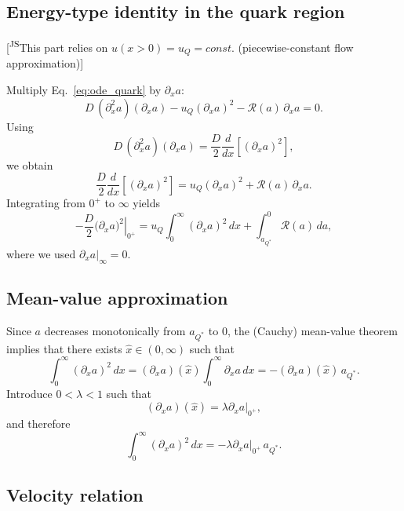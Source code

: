 \documentclass[11pt]{article}
\newcommand{\JScom}[1]{\textsf{\color{violet} [\textsuperscript{JS}#1]}}
\begin{document}
\subsection*{Energy-type identity in the quark region}

\JScom{This part relies on $u(x>0) = u_Q = const.$ (piecewise-constant flow approximation)}

Multiply Eq.~\eqref{eq:ode_quark} by $\partial_x a$:
\begin{equation}
D\,(\partial_x^2 a)(\partial_x a) - u_Q(\partial_x a)^2 - \mathcal R(a)\,\partial_x a = 0.
\end{equation}
Using
\[
D\,(\partial_x^2 a)(\partial_x a)=\frac{D}{2}\frac{d}{dx}\!\left[(\partial_x a)^2\right],
\]
we obtain
\begin{equation}
\frac{D}{2}\frac{d}{dx}\!\left[(\partial_x a)^2\right]
=
u_Q(\partial_x a)^2
+
\mathcal R(a)\,\partial_x a.
\end{equation}
Integrating from $0^+$ to $\infty$ yields
\begin{equation}
-\frac{D}{2}\left.\bigl(\partial_x a\bigr)^2\right|_{0^+}
=
u_Q \int_0^\infty (\partial_x a)^2\,dx
+
\int_{a_{Q^*}}^{0}\mathcal R(a)\,da,
\label{eq:balance_piecewise}
\end{equation}
where we used $\left.\partial_x a\right|_{\infty}=0$.

\subsection*{Mean-value approximation}

Since $a$ decreases monotonically from $a_{Q^*}$ to $0$, the (Cauchy) mean-value
theorem implies that there exists $\hat x\in(0,\infty)$ such that
\begin{equation}
\int_0^\infty (\partial_x a)^2\,dx
=
(\partial_x a)(\hat x)\int_0^\infty \partial_x a\,dx
=
-(\partial_x a)(\hat x)\,a_{Q^*}.
\end{equation}
Introduce $0<\lambda<1$ such that
\begin{equation}
(\partial_x a)(\hat x)=\lambda\left.\partial_x a\right|_{0^+},
\end{equation}
and therefore
\begin{equation}
\int_0^\infty (\partial_x a)^2\,dx
=
- \lambda \left.\partial_x a\right|_{0^+}\, a_{Q^*}.
\label{eq:int_sq_piecewise}
\end{equation}

\subsection*{Velocity relation}
\end{document}
